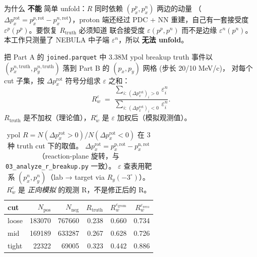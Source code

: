 \documentclass[a4paper,11pt]{ctexart}
\begin{document}
为什么 \textbf{不能} 简单 unfold：$R$ 同时依赖 $(p_x^p, p_x^n)$ 两边的动量
（$\Delta p_x^\mathrm{rot} = p_x^{p,\mathrm{rot}} - p_x^{n,\mathrm{rot}}$），proton 端还经过 PDC + NN
重建，自己有一套接受度 $\varepsilon^p(p^p)$。要恢复 $R_\mathrm{truth}$ 必须知道
联合接受度 $\varepsilon(p^p, p^n)$ 而不是边缘 $\varepsilon^n(p^n)$。本工作只测量了 NEBULA 中子端
$\varepsilon^n$，所以 \textbf{无法 unfold}。

把 Part A 的 \texttt{joined.parquet} 中 3.38M ypol breakup truth 事件以
$(p_x^{n,\mathrm{truth}}, p_y^{n,\mathrm{truth}})$ 落到 Part B 的 $(p_x, p_y)$ 网格 (步长 20/10 MeV/c)，
对每个 cut 子集，按 $\Delta p_x^\mathrm{rot}$ 符号分组求 $\varepsilon$ 之和：
$$R_w^{\varepsilon} \;=\; \frac{\sum_{i:\,(\Delta p_x^\mathrm{rot})_i > 0}\, \varepsilon_i^n}
                                {\sum_{i:\,(\Delta p_x^\mathrm{rot})_i < 0}\, \varepsilon_i^n}.$$
$R_\mathrm{truth}$ 是不加权（理论值），$R_w^\varepsilon$ 是 $\varepsilon$ 加权后（模拟观测值）。

\begin{table}[h]
\centering
\caption{ypol $R = N(\Delta p_x^\mathrm{rot} > 0) / N(\Delta p_x^\mathrm{rot} < 0)$
在 3 种 truth cut 下的取值。
$\Delta p_x^\mathrm{rot} = p_x^{\mathrm{p,rot}} - p_x^{\mathrm{n,rot}}$
（reaction-plane 旋转，与 \texttt{03\_analyze\_r\_breakup.py} 一致）。
$\varepsilon$ 查表用靶系 $(p_x^n, p_y^n)$（lab → target via $R_y(-3^\circ)$）。
$R_w^\varepsilon$ 是 \emph{正向模拟} 的观测 R，不是修正后的 R。}
\label{tab:R_acceptance}
\begin{tabular}{lrrrrr}
\toprule
cut & $N_\mathrm{pos}$ & $N_\mathrm{neg}$ & $R_\mathrm{truth}$ &
$R_w^{\varepsilon_\mathrm{geom}}$ & $R_w^{\varepsilon_\mathrm{reco}}$ \\
\midrule
loose & 183070 & 767660 & 0.238 & 0.660 & 0.734 \\
mid   & 169189 & 633287 & 0.267 & 0.628 & 0.726 \\
tight &  22322 &  69005 & 0.323 & 0.442 & 0.886 \\
\bottomrule
\end{tabular}
\end{table}
\end{document}
